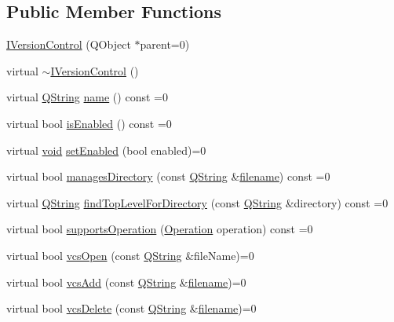 \subsection*{Public Member Functions}
\begin{DoxyCompactItemize}
\item 
\hyperlink{group___core_plugin_ga6874d8e569f4d366076a220f2ad376cb}{I\-Version\-Control} (Q\-Object $\ast$parent=0)
\item 
virtual \hyperlink{group___core_plugin_ga3d394e8a0666887600e171f4b612f44f}{$\sim$\-I\-Version\-Control} ()
\item 
virtual \hyperlink{group___u_a_v_objects_plugin_gab9d252f49c333c94a72f97ce3105a32d}{Q\-String} \hyperlink{group___core_plugin_gacc4bf28135f3227a9ffb7e415a128402}{name} () const =0
\item 
virtual bool \hyperlink{group___core_plugin_ga1f7ac731342641d9d5af88890bd8ead3}{is\-Enabled} () const =0
\item 
virtual \hyperlink{group___u_a_v_objects_plugin_ga444cf2ff3f0ecbe028adce838d373f5c}{void} \hyperlink{group___core_plugin_gad2603d8245ff4736997acb67cbbbffc7}{set\-Enabled} (bool enabled)=0
\item 
virtual bool \hyperlink{group___core_plugin_gababbcfacf10ad9291279be4f8b9b463e}{manages\-Directory} (const \hyperlink{group___u_a_v_objects_plugin_gab9d252f49c333c94a72f97ce3105a32d}{Q\-String} \&\hyperlink{ioapi_8h_a7a03a664b090ce5c848ecb31cb4a2fa8}{filename}) const =0
\item 
virtual \hyperlink{group___u_a_v_objects_plugin_gab9d252f49c333c94a72f97ce3105a32d}{Q\-String} \hyperlink{group___core_plugin_gaf2501432db3d57cb2ecc3df1c0faf486}{find\-Top\-Level\-For\-Directory} (const \hyperlink{group___u_a_v_objects_plugin_gab9d252f49c333c94a72f97ce3105a32d}{Q\-String} \&directory) const =0
\item 
virtual bool \hyperlink{group___core_plugin_gac9b7a4873f725cbabed177282491485a}{supports\-Operation} (\hyperlink{group___core_plugin_gaf73287914241594ba6e179f65b63bd61}{Operation} operation) const =0
\item 
virtual bool \hyperlink{group___core_plugin_gaba2b30b352afb3d68ccc8564a70b850d}{vcs\-Open} (const \hyperlink{group___u_a_v_objects_plugin_gab9d252f49c333c94a72f97ce3105a32d}{Q\-String} \&file\-Name)=0
\item 
virtual bool \hyperlink{group___core_plugin_gab477bb2fc2891e052a79c68c89f03a52}{vcs\-Add} (const \hyperlink{group___u_a_v_objects_plugin_gab9d252f49c333c94a72f97ce3105a32d}{Q\-String} \&\hyperlink{ioapi_8h_a7a03a664b090ce5c848ecb31cb4a2fa8}{filename})=0
\item 
virtual bool \hyperlink{group___core_plugin_ga1a7e0110cf76291cc86b7dc3179499af}{vcs\-Delete} (const \hyperlink{group___u_a_v_objects_plugin_gab9d252f49c333c94a72f97ce3105a32d}{Q\-String} \&\hyperlink{ioapi_8h_a7a03a664b090ce5c848ecb31cb4a2fa8}{filename})=0
\end{DoxyCompactItemize}


